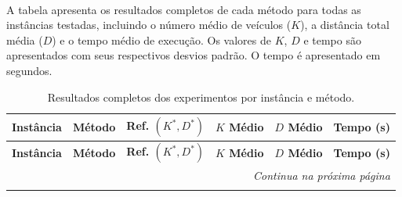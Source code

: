 \paragraph{} A tabela apresenta os resultados completos de cada método para todas as instâncias testadas, incluindo o número médio de veículos ($K$), a distância total média ($D$) e o tempo médio de execução. Os valores de $K$, $D$ e tempo são apresentados com seus respectivos desvios padrão. O tempo é apresentado em segundos.

{\footnotesize
\begin{longtable}{llcccc}
\caption[\small{Resultados completos por instância e método.}]{\label{tab:resultados_completos} \small{Resultados completos dos experimentos por instância e método.}} \\
\toprule
\textbf{Instância} & \textbf{Método} & \textbf{Ref. $(K^*, D^*)$} & \textbf{$K$ Médio} & \textbf{$D$ Médio} & \textbf{Tempo (s)} \\
\midrule
\endfirsthead

\toprule
\textbf{Instância} & \textbf{Método} & \textbf{Ref. $(K^*, D^*)$} & \textbf{$K$ Médio} & \textbf{$D$ Médio} & \textbf{Tempo (s)} \\
\midrule
\endhead

\midrule
\multicolumn{6}{r}{\textit{Continua na próxima página}} \\
\midrule
\endfoot


\end{longtable}}
